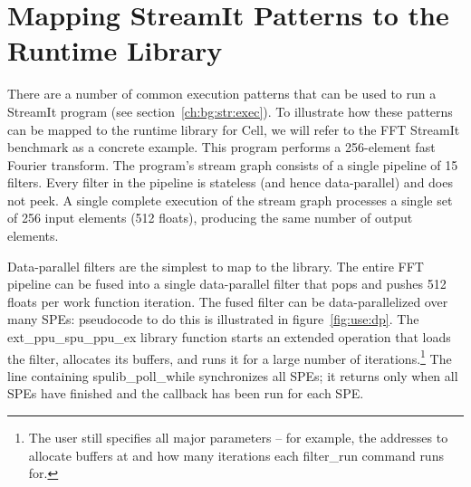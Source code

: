 \section{Mapping StreamIt Patterns to the Runtime Library}\label{ch:use}

There are a number of common execution patterns that can be used to run a StreamIt program (see section~\ref{ch:bg:str:exec}). To illustrate how these patterns can be mapped to the runtime library for Cell, we will refer to the FFT StreamIt benchmark as a concrete example. This program performs a 256-element fast Fourier transform. The program's stream graph consists of a single pipeline of 15 filters. Every filter in the pipeline is stateless (and hence data-parallel) and does not peek. A single complete execution of the stream graph processes a single set of 256 input elements (512 floats), producing the same number of output elements.


Data-parallel filters are the simplest to map to the library. The entire FFT pipeline can be fused into a single data-parallel filter that pops and pushes 512 floats per work function iteration. The fused filter can be data-parallelized over many SPEs: pseudocode to do this is illustrated in figure~\ref{fig:use:dp}. The \textsf{ext\_ppu\_spu\_ppu\_ex} library function starts an extended operation that loads the filter, allocates its buffers, and runs it for a large number of iterations.\footnote{The user still specifies all major parameters -- for example, the addresses to allocate buffers at and how many iterations each \textsf{filter\_run} command runs for.} The line containing \textsf{spulib\_poll\_while} synchronizes all SPEs; it returns only when all SPEs have finished and the callback has been run for each SPE.

